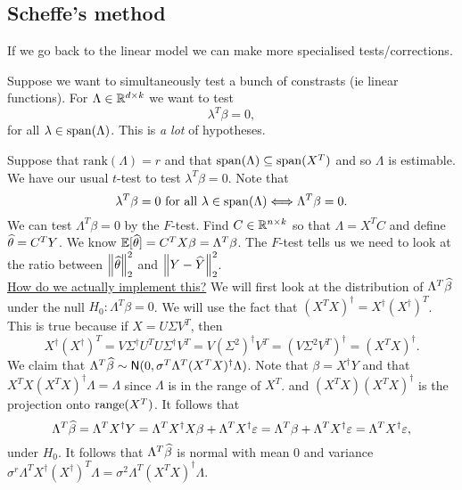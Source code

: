 \subsection{Scheffe's method}
If we go back to the linear model we can make more specialised tests/corrections.

Suppose we want to simultaneously test a bunch of constrasts (ie linear functions). For $\Lambda \in {\mathbb R}^{d \times k}$ we want to test 
\[\lambda^T\beta = 0,\]
for all $\lambda \in \operatorname{span}(\Lambda)$. This is \emph{a lot} of hypotheses. 

Suppose that $\text{rank}(\Lambda) = r$ and that $\operatorname{span}(\Lambda) \subseteq \operatorname{span}(X^T)$ and so $\Lambda$ is estimable. We have our usual $t$-test to test $\lambda^T\beta = 0$. Note that 
\[\lambda^T \beta = 0 \text{ for all } \lambda \in \operatorname{span}(\Lambda) \Longleftrightarrow \Lambda^T\beta  = 0. \]
We can test $\Lambda^T \beta = 0$ by the $F$-test. Find $C \in {\mathbb R}^{n \times k}$ so that $\Lambda = X^TC$ and define $\widehat{\theta} = C^TY$. We know ${\mathbb{E}}[\widehat{\theta}] = C^TX\beta = \Lambda^T\beta$. The $F$-test tells us we need to look at the ratio between $\left\|\widehat{{\theta}}\right\|_2^2$ and $\left\|Y-\widehat{Y}\right\|_2^2$.\\

\underline{How do we actually implement this?}
We will first look at the distribution of $\Lambda^T \widehat{\beta}$ under the null $H_0 :\Lambda^T \beta = 0$.  We will use the fact that $(X^TX)^\dagger = X^\dagger (X^\dagger)^T$. This is true because if $X = U\Sigma V^T$, then 
\[X^\dagger (X^\dagger)^T = V\Sigma^\dagger U^T U \Sigma^\dagger V^T = V(\Sigma^2)^\dagger V^T = (V\Sigma^2 V^T)^\dagger = (X^TX)^\dagger. \]
We claim that $\Lambda^T \widehat{\beta} \sim {\mathsf{N}}(0, \sigma^T \Lambda^T(X^TX)^\dagger \Lambda)$. Note that  $\beta = X^\dagger Y$ and that $X^TX(X^TX)^\dagger \Lambda= \Lambda$ since $\Lambda$ is in the range of $X^T$. and $(X^TX)(X^TX)^\dagger$ is the projection onto $\operatorname{range}(X^T)$. It follows that 
\[\Lambda^T\widehat{\beta} = \Lambda^T X^\dagger Y = \Lambda^T X^\dagger X \beta + \Lambda^T X^\dagger \varepsilon = \Lambda^T\beta + \Lambda^T X^\dagger \varepsilon = \Lambda^T X^\dagger \varepsilon, \]
under $H_0$. It follows that $\Lambda^T \widehat{\beta}$ is normal with mean 0 and variance $\sigma^r \Lambda^T X^\dagger (X^\dagger)^T \Lambda = \sigma^2 \Lambda^T (X^TX)^\dagger \Lambda$. 

